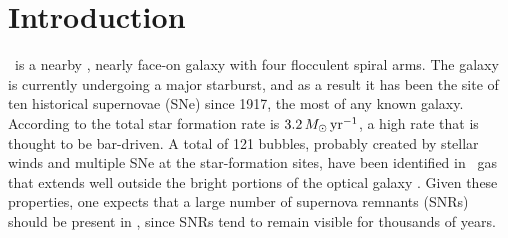 



\section{Introduction} \label{sec:intro}

\gal\ is a nearby \cite[$6.72\pm 0.15$ Mpc,][]{tikhonov14}, nearly face-on \cite[$i = 32.6\degr$,][]{deblok08} galaxy with four flocculent spiral arms.  The galaxy is currently undergoing a major starburst, and as a result it has been the site of ten historical supernovae (SNe) since 1917, the most of any known galaxy. According to \citet{jarrett13} the total star formation rate is $3.2\, M_\odot\,{\rm yr}^{-1}$, a high rate that is thought to be bar-driven.  A total of 121 bubbles, probably created by stellar winds and multiple SNe at the star-formation sites, have been identified in \hi\ gas that extends well outside the bright portions of the optical galaxy \citep{boomsma08}.  %
Given these properties, one expects that a large number of supernova remnants (SNRs) should be present in \gal, since SNRs tend to remain visible for thousands of years.   

